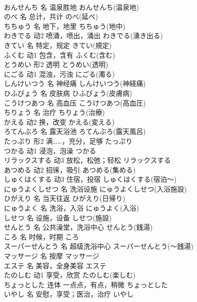\documentclass[8pt]{extreport}
\begin{document}
\begin{CJK}{UTF8}{min}
\\	おんせんち	名	温泉胜地	おんせんち(温泉地)	
\\	のべ	名	总计，共计	のべ(延べ)	
\\	ちちゅう	名	地下，地里	ちちゅう(地中)	
\\	わきでる	动2	喷涌，喷出，涌出	わきでる(湧き出る)	
\\	きてい	名	特定，规定	きてい(規定)	
\\	ふくむ	动1	包含，含有	ふくむ(含む)	
\\	とうめい	形2	透明	とうめい(透明)	
\\	にごる	动1	混浊，污浊	にごる(濁る)	
\\	しんけいつう	名	神经痛	しんけいつう(神経痛)	
\\	ひふびょう	名	皮肤病	ひふびょう(皮膚病)	
\\	こうけつあつ	名	高血压	こうけつあつ(高血圧)	
\\	ちりょう	名	治疗	ちりょう(治療)	
\\	かえる	动2	换，改变	かえる(変える)	
\\	ろてんぶろ	名	露天浴池	ろてんぶろ(露天風呂)	
\\	たっぷり	形2	满……，充分，足够	たっぷり	
\\	つかる	动1	浸泡，泡澡	つかる	
\\	リラックスする	动3	放松，松弛；轻松	リラックスする	
\\	あつめる	动2	招徕，吸引	あつめる(集める)	
\\	しゅくはくする	动3	住宿，投宿	しゅくはくする(宿泊～)	
\\	にゅうよくしせつ	名	洗浴设施	にゅうよくしせつ(入浴施設)	
\\	ひがえり	名	当天往返	ひがえり(日帰り)	
\\	にゅうよく	名	洗浴，入浴	にゅうよく(入浴)	
\\	しせつ	名	设施，设备	しせつ(施設)	
\\	せんとう	名	公共澡堂，洗浴中心	せんとう(銭湯)	
\\	ころ	名	时候，时期	ころ	
\\	スーパーせんとう	名	超级洗浴中心	スーパーせんとう(～銭湯)	
\\	マッサージ	名	按摩	マッサージ	
\\	エステ	名	美容，全身美容	エステ	
\\	たのしむ	动1	享受，欣赏	たのしむ(楽しむ)	
\\	ちょっとした	连体	一点点，有点，稍微	ちょっとした	
\\	いやし	名	安慰，享受；医治，治疗	いやし	

\end{CJK}
\end{document}
